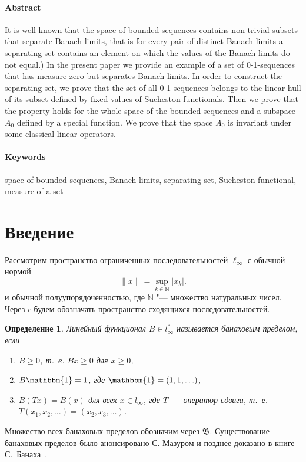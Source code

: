 \documentclass[a4paper,14pt]{article} %
\theoremstyle{plain}
\newtheorem{definition}[lemma]{Определение}
\begin{document}
\paragraph{Abstract}
It is well known that the space of bounded sequences contains non-trivial subsets
that separate Banach limits,
that is
for every pair of distinct Banach limits a separating set contains an element
on which the values of the Banach limits do not equal.)
In the present paper we provide an example of a set of 0-1-sequences that has measure zero
but separates Banach limits.
In order to construct the separating set, we prove that
the set of all 0-1-sequences belongs to the linear hull of its subset
defined by fixed values of Sucheston functionals.
Then we prove that the property holds for the whole space of the bounded sequences
and a subspace $A_0$ defined by a special function.
We prove that the space $A_0$ is invariant under some classical linear operators.




\paragraph{Keywords}
	space of bounded sequences,
	Banach limits,
	separating set,
	Sucheston functional,
	measure of a set



\section{Введение}

Рассмотрим пространство ограниченных последовательностей $\ell_\infty$ с обычной нормой
\begin{equation*}
	\|x\| = \sup_{k\in\mathbb{N}} |x_k|
	.
\end{equation*}
и обычной полуупорядоченностью, где $\mathbb{N}$ "--- множество натуральных чисел.
Через $c$ будем обозначать пространство сходящихся последовательностей.


\begin{definition}
	Линейный функционал $B\in l_\infty^*$ называется банаховым пределом,
	если
	\begin{enumerate}
		\item
			$B\geq0$, т.~е. $Bx \geq 0$ для $x \geq 0$,
		\item
			$B\mathbbm{1}=1$, где $\mathbbm{1} =(1,1,\ldots)$,
		\item
			$B(Tx)=B(x)$ для всех $x\in l_\infty$, где $T$~---
		оператор сдвига, т.~е. $T(x_1,x_2,\ldots)=(x_2,x_3,\ldots)$.
	\end{enumerate}
\end{definition}
Множество всех банаховых пределов обозначим через $\mathfrak{B}$.
Существование банаховых пределов было анонсировано С. Мазуром \cite{Mazur} и позднее доказано в книге С.~Банаха~\cite{B}.
\end{document}
